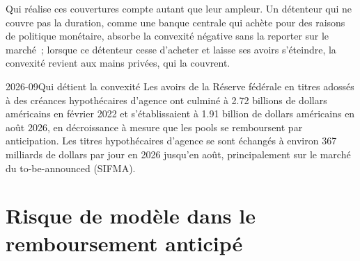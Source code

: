 Qui réalise ces couvertures compte autant que leur ampleur. Un détenteur qui ne couvre pas la duration,
comme une banque centrale qui achète pour des raisons de politique monétaire, absorbe la convexité négative
sans la reporter sur le marché~; lorsque ce détenteur cesse d'acheter et laisse ses avoirs s'éteindre,
la convexité revient aux mains privées, qui la couvrent.

\begin{omfigure}

\label{fig:rc:mortgage-modelling:fed}
\end{omfigure}

\begin{dated}{2026-09}{Qui détient la convexité}\label{dat:rc:mortgage-modelling:holders}
Les avoirs de la Réserve fédérale en titres adossés à des créances hypothécaires d'agence ont culminé à 2.72 billions
de dollars américains en février 2022 et s'établissaient à 1.91 billion de dollars américains en août 2026, en décroissance
à mesure que les pools se remboursent par anticipation. Les titres hypothécaires d'agence se sont échangés à environ
367 milliards de dollars par jour en 2026 jusqu'en août, principalement sur le marché du to-be-announced (SIFMA).
\end{dated}

\section{Risque de modèle dans le remboursement anticipé}

